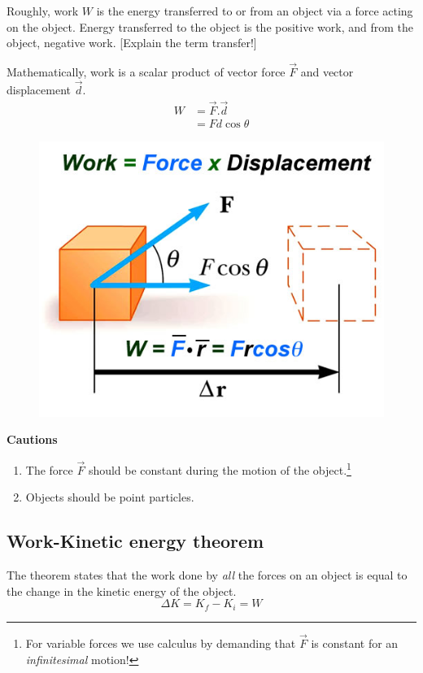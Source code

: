 \documentclass[10pt]{article}
\begin{document}
Roughly, work $W$ is the energy transferred to or from an object via a force acting on the object.  Energy transferred to the object is the positive work, and from the object, negative work.  [Explain the term transfer!]

Mathematically, work is a scalar product of vector force $\vec{F}$ and vector displacement $\vec{d}$.  
\begin{equation}
\begin{split}
  W &= \vec{F}.\vec{d}\\
    &= Fd\cos\theta
\end{split}
\end{equation}
\begin{figure}[h]
\label{Scalar product}
\includegraphics[scale=.5]{workd}
\centering
\end{figure}
\newpage
\textbf{Cautions}
\begin{enumerate}
\item The force $\vec{F}$ should be constant during the motion of the object.\footnote{For variable forces we use calculus by demanding that $\vec{F}$ is constant for an \emph{infinitesimal} motion!}
\item Objects should be point particles.
\end{enumerate}

\subsection{Work-Kinetic energy theorem}
The theorem states that the work done by \emph{all} the forces on an object is equal to the change in the kinetic energy of the object.
\begin{equation}
  \Delta K = K_f-K_i = W
\end{equation}
\end{document}
